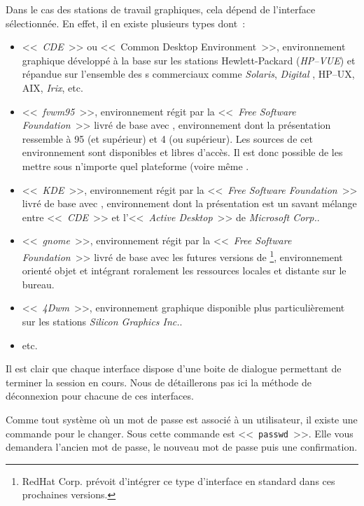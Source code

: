 Dans le cas des stations de travail graphiques, cela d{\'e}pend de l'interface
s{\'e}lectionn{\'e}e. En effet, il en existe plusieurs types dont~:
\begin{itemize}
	\item	<<~{\sl CDE}~>> ou <<~Common Desktop Environment~>>, environnement
			graphique d{\'e}velopp{\'e} {\`a} la base sur les stations Hewlett-Packard
			({\sl HP--VUE}) et r{\'e}pandue sur l'ensemble des {\Unix}s commerciaux
			comme {\sl Solaris}, {\sl Digital {\Unix}}, {\sf HP--UX},
			{\sf AIX}, {\sl Irix}, etc.
	\item	<<~{\sl fvwm95}~>>, environnement r{\'e}git par la <<~{\sl Free Software
			Foundation}~>> livr{\'e} de base avec {\Linux}, environnement
			dont la pr{\'e}sentation ressemble {\`a} {\Windows}95 (et sup{\'e}rieur)
			et {\WindowsNT} 4 (ou sup{\'e}rieur). Les sources de cet environnement
			sont disponibles et libres d'acc{\`e}s. Il est donc possible
			de les mettre sous n'importe quel plateforme {\Unix} (voire
			m{\^e}me {\OpenVMS}.
	\item	<<~{\sl KDE}~>>, environnement r{\'e}git par la <<~{\sl Free Software
			Foundation}~>> livr{\'e} de base avec {\Linux}, environnement
			dont la pr{\'e}sentation est un savant m{\'e}lange entre <<~{\sl CDE}~>>
			et l'<<~{\sl Active Desktop}~>> de {\sl Microsoft Corp.}.
	\item	<<~{\sl gnome}~>>, environnement r{\'e}git par la <<~{\sl Free Software
			Foundation}~>> livr{\'e} de base avec les futures versions de
			{\Linux}\footnote{RedHat Corp. pr{\'e}voit d'int{\'e}grer ce type
			d'interface en standard dans ces prochaines versions.},
			environnement orient{\'e} objet et int{\'e}grant roralement les ressources
			locales et distante sur le bureau.
	\item	<<~{\sl 4Dwm}~>>, environnement graphique disponible plus
			particuli{\`e}rement sur les stations {\sl Silicon Graphics Inc.}.
	\item	etc.
\end{itemize}

Il est clair que chaque interface dispose d'une boite de dialogue permettant de terminer la session en cours. Nous de d{\'e}taillerons pas ici la m{\'e}thode de d{\'e}connexion pour chacune de ces interfaces.

Comme tout syst{\`e}me o{\`u} un mot de passe est associ{\'e} {\`a} un utilisateur, il existe une commande pour le changer. Sous {\Unix} cette commande est <<~{\tt passwd}~>>.
Elle vous demandera l'ancien mot de passe, le nouveau mot de passe puis une confirmation.

